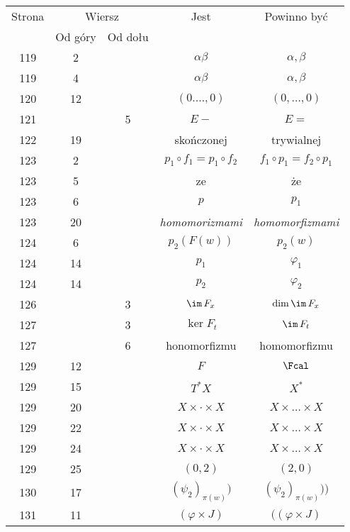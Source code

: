 \documentclass[a4paper,11pt]{article}
\numberwithin{equation}{section}
\begin{document}
\begin{center}
  \begin{tabular}{|c|c|c|c|c|}
    \hline
    Strona & \multicolumn{2}{c|}{Wiersz} & Jest
                              & Powinno być \\ \cline{2-3}
    & Od góry & Od dołu & & \\
    \hline
    119 & \hphantom{0}2 & & $\alpha\beta$ & $\alpha, \beta$ \\
    119 & \hphantom{0}4 & & $\alpha\beta$ & $\alpha, \beta$ \\
    120 & 12 & & $( 0. \ldots, 0 )$ & $( 0, \ldots, 0 )$ \\
    121 & & \hphantom{0}5 & $E -$ & $E =$ \\
    122 & 19 & & skończonej & trywialnej \\
    123 & \hphantom{0}2 & & $p_{ 1 } \circ f_{ 1 } = p_{ 1 } \circ f_{ 2 }$
           & $f_{ 1 } \circ p_{ 1 } = f_{ 2 } \circ p_{ 1 }$ \\
    123 & \hphantom{0}5 & & ze & że \\
    123 & \hphantom{0}6 & & $p$ & $p_{ 1 }$ \\
    123 & 20 & & \textit{homomorizmami} & \textit{homomorfizmami} \\
    124 & \hphantom{0}6 & & $p_{ 2 }( F( w ) )$ & $p_{ 2 }( w )$ \\
    124 & 14 & & $p_{ 1 }$ & $\varphi_{ 1 }$ \\
    124 & 14 & & $p_{ 2 }$ & $\varphi_{ 2 }$ \\
    126 & & \hphantom{0}3 & $\im \, F_{ x }$ & $\dim\im \, F_{ x }$ \\
    127 & & \hphantom{0}3 & $\ker F_{ t }$ & $\im \, F_{ t }$ \\
    127 & & \hphantom{0}6 & honomorfizmu & homomorfizmu \\
    129 & 12 & & $F$ & $\Fcal$ \\
    129 & 15 & & $T^{ * }X$ & $X^{ * }$ \\
    129 & 20 & & $X \times \cdot \times X$ & $X \times \ldots \times X$ \\
    129 & 22 & & $X \times \cdot \times X$ & $X \times \ldots \times X$ \\
    129 & 24 & & $X \times \cdot \times X$ & $X \times \ldots \times X$ \\
    129 & 25 & & $( 0, 2 )$ & $( 2, 0 )$ \\
    130 & 17 & & $( \psi_{ 2 } )_{ \pi( w ) } )$
           & $( \psi_{ 2 } )_{ \pi( w ) } ) \big)$ \\
    131 & 11 & & $( \varphi \times J )$ & $( ( \varphi \times J )$ \\

\end{tabular}
\end{center}
\end{document}
